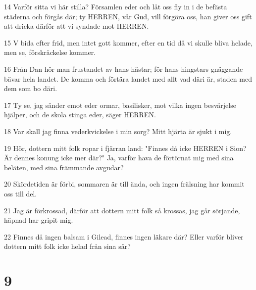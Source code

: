 \par 14 Varför sitta vi här stilla? Församlen eder och låt oss fly in i de befästa städerna och förgås där; ty HERREN, vår Gud, vill förgöra oss, han giver oss gift att dricka därför att vi syndade mot HERREN.
\par 15 V bida efter frid, men intet gott kommer, efter en tid då vi skulle bliva helade, men se, förskräckelse kommer.
\par 16 Från Dan hör man frustandet av hans hästar; för hans hingstars gnäggande bävar hela landet. De komma och förtära landet med allt vad däri är, staden med dem som bo däri.
\par 17 Ty se, jag sänder emot eder ormar, basilisker, mot vilka ingen besvärjelse hjälper, och de skola stinga eder, säger HERREN.
\par 18 Var skall jag finna vederkvickelse i min sorg? Mitt hjärta är sjukt i mig.
\par 19 Hör, dottern mitt folk ropar i fjärran land: "Finnes då icke HERREN i Sion? Är dennes konung icke mer där?" Ja, varför hava de förtörnat mig med sina beläten, med sina främmande avgudar?
\par 20 Skördetiden är förbi, sommaren är till ända, och ingen frälsning har kommit oss till del.
\par 21 Jag är förkrossad, därför att dottern mitt folk så krossas, jag går sörjande, häpnad har gripit mig.
\par 22 Finnes då ingen balsam i Gilead, finnes ingen läkare där? Eller varför bliver dottern mitt folk icke helad från sina sår?

\chapter{9}

